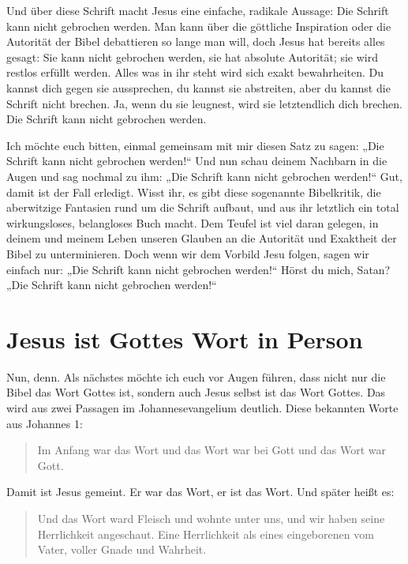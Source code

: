 Und über diese Schrift macht Jesus eine einfache, radikale Aussage: Die Schrift kann nicht gebrochen werden. 
Man kann über die göttliche Inspiration oder die Autorität der Bibel debattieren so lange man will, doch Jesus hat bereits alles gesagt: Sie kann nicht gebrochen werden, sie hat absolute Autorität; sie wird restlos erfüllt werden. 
Alles was in ihr steht wird sich exakt bewahrheiten. Du kannst dich gegen sie aussprechen, du kannst sie abstreiten, aber du kannst die Schrift nicht brechen. 
Ja, wenn du sie leugnest, wird sie letztendlich dich brechen. Die Schrift kann nicht gebrochen werden.

Ich möchte euch bitten, einmal gemeinsam mit mir diesen Satz zu sagen: „Die Schrift kann nicht gebrochen werden!“ 
Und nun schau deinem Nachbarn in die Augen und sag nochmal zu ihm: „Die Schrift kann nicht gebrochen werden!“ 
Gut, damit ist der Fall erledigt. 
Wisst ihr, es gibt diese sogenannte Bibelkritik, die aberwitzige Fantasien rund um die Schrift aufbaut, und aus ihr letztlich ein total wirkungsloses, belangloses Buch macht. 
Dem Teufel ist viel daran gelegen, in deinem und meinem Leben unseren Glauben an die Autorität und Exaktheit der Bibel zu unterminieren. 
Doch wenn wir dem Vorbild Jesu folgen, sagen wir einfach nur: „Die Schrift kann nicht gebrochen werden!“ 
Hörst du mich, Satan? 
„Die Schrift kann nicht gebrochen werden!“

\section{Jesus ist Gottes Wort in Person}

Nun, denn. Als nächstes möchte ich euch vor Augen führen, dass nicht nur die Bibel das Wort Gottes ist, sondern auch Jesus selbst ist das Wort Gottes. 
Das wird aus zwei Passagen im Johannesevangelium deutlich. 
Diese bekannten Worte aus Johannes 1:

\begin{quotation}
  Im Anfang war das Wort und das Wort war bei Gott und das Wort war Gott.
\end{quotation}

Damit ist Jesus gemeint. 
Er war das Wort, er ist das Wort. 
Und später heißt es:

\begin{quotation}
  Und das Wort ward Fleisch und wohnte unter uns, und wir haben seine Herrlichkeit angeschaut.
  Eine Herrlichkeit als eines eingeborenen vom Vater, voller Gnade und Wahrheit.
\end{quotation}

